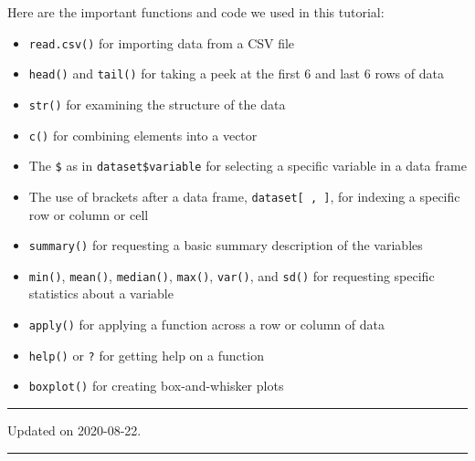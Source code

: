 \documentclass[
]{book}
\providecommand{\tightlist}{%
  \setlength{\itemsep}{0pt}\setlength{\parskip}{0pt}}
\begin{document}
Here are the important functions and code we used in this tutorial:

\begin{itemize}
\tightlist
\item
  \texttt{read.csv()} for importing data from a CSV file\\
\item
  \texttt{head()} and \texttt{tail()} for taking a peek at the first 6 and last 6 rows of data\\
\item
  \texttt{str()} for examining the structure of the data
\item
  \texttt{c()} for combining elements into a vector
\item
  The \texttt{\$} as in \texttt{dataset\$variable} for selecting a specific variable in a data frame
\item
  The use of brackets after a data frame, \texttt{dataset{[}\ ,\ {]}}, for indexing a specific row or column or cell
\item
  \texttt{summary()} for requesting a basic summary description of the variables
\item
  \texttt{min()}, \texttt{mean()}, \texttt{median()}, \texttt{max()}, \texttt{var()}, and \texttt{sd()} for requesting specific statistics about a variable
\item
  \texttt{apply()} for applying a function across a row or column of data
\item
  \texttt{help()} or \texttt{?} for getting help on a function
\item
  \texttt{boxplot()} for creating box-and-whisker plots
\end{itemize}

\begin{center}\rule{0.5\linewidth}{0.5pt}\end{center}

Updated on 2020-08-22.

\begin{center}\rule{0.5\linewidth}{0.5pt}\end{center}

  
\end{document}
